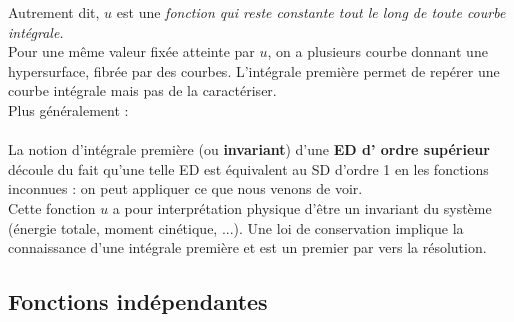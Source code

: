	Autrement dit, $u$ est une \textit{fonction qui reste constante tout le long 
	de toute courbe intégrale.}\\
	Pour une même valeur fixée atteinte par $u$, on a plusieurs courbe donnant 
	une hypersurface, fibrée par des courbes. L'intégrale première permet de 
	repérer une courbe intégrale mais pas de la caractériser.\\
	
	Plus généralement :\\
	\ \\
	
	La notion d'intégrale première (ou \textbf{invariant}) d'une \textbf{ED d'
	ordre supérieur} découle du fait qu'une telle ED est équivalent au SD d'ordre 
	1 en les fonctions inconnues : on peut appliquer ce que nous venons de voir.\\

	Cette fonction $u$ a pour interprétation physique d'être un invariant du 
	système (énergie totale, moment cinétique, ...). Une loi de conservation 
	implique la connaissance d'une intégrale première et est un premier par 
	vers la résolution.
	
	\setcounter{subsection}{5}
	\subsection{Fonctions indépendantes}
	\ \\
	

